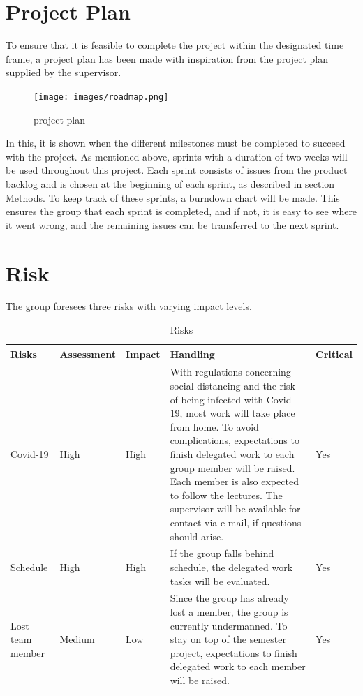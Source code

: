 \section{Project Plan}
To ensure that it is feasible to complete the project within the designated
time frame, a project plan has been made with inspiration from the
\href{https://docs.google.com/spreadsheets/d/1mZXxgDiwWwWpSyaQmMcafTjvXa2lQriszwTyt-Pf5BA/edit#gid=0}{project plan} supplied by the supervisor.

\begin{figure}[ht]
\centering 
\texttt{[image: images/roadmap.png]}
\label{figure:Project_plan}
\caption{project plan} 
\end{figure}

In this, it is shown when the different milestones must be completed to succeed
with the project. As mentioned above, sprints with a duration of two weeks will
be used throughout this project. Each sprint consists of issues from the product
backlog and is chosen at the beginning of each sprint, as described in section
Methods. To keep track of these sprints, a burndown chart will be made. This 
ensures the group that each sprint is completed, and if not, it is easy to see
where it went wrong, and the remaining issues can be transferred to
the next sprint.

\section{Risk}
The group foresees three risks with varying impact levels.

\begin{table}[ht]
    \begin{tabularx}{\textwidth}{|>{\RaggedRight}p{1.7cm}|>{\RaggedRight}p{2.2cm}|>{\RaggedRight}p{1.4cm}|>{\RaggedRight}X|>{\RaggedRight}p{1.6cm}|}
        \hline
        \textbf{Risks} & \textbf{Assessment} & \textbf{Impact} & \textbf{Handling} & \textbf{Critical} \\
        \hline
        Covid-19 & High & High & 
        With regulations concerning social distancing and the risk of being infected
        with Covid-19, most work will take place from home. To avoid complications,
        expectations to finish delegated work to each group member will be raised. Each
        member is also expected to follow the lectures. The supervisor will be available
        for contact via e-mail, if questions should arise.
                 & Yes \\
                 \hline
        Schedule & High & High &
        If the group falls behind schedule, the delegated work tasks will be evaluated.
                 & Yes \\
                 \hline
        Lost team member        & Medium & Low & 
        Since the group has already lost a member, the group is currently undermanned.
        To stay on top of the semester project, expectations to finish delegated work to
        each member will be raised.
                                & Yes \\
                                \hline
    \end{tabularx}
    \caption{Risks} 
    \label{table:Risks}
\end{table} 


